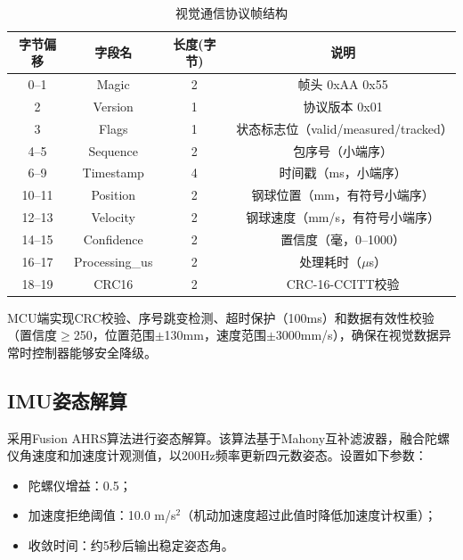 \documentclass[12pt,a4paper]{ctexart}
\begin{document}
\begin{table}[H]
    \centering
    \footnotesize
    \caption{视觉通信协议帧结构}
    \label{tab:vision_protocol}
    \begin{tabular}{|c|c|c|c|}
        \hline
        字节偏移 & 字段名 & 长度(字节) & 说明 \\
        \hline
        0--1 & Magic & 2 & 帧头 0xAA 0x55 \\
        \hline
        2 & Version & 1 & 协议版本 0x01 \\
        \hline
        3 & Flags & 1 & 状态标志位（valid/measured/tracked） \\
        \hline
        4--5 & Sequence & 2 & 包序号（小端序） \\
        \hline
        6--9 & Timestamp & 4 & 时间戳（ms，小端序） \\
        \hline
        10--11 & Position & 2 & 钢球位置（mm，有符号小端序） \\
        \hline
        12--13 & Velocity & 2 & 钢球速度（mm/s，有符号小端序） \\
        \hline
        14--15 & Confidence & 2 & 置信度（毫，0--1000） \\
        \hline
        16--17 & Processing\_us & 2 & 处理耗时（$\mu$s） \\
        \hline
        18--19 & CRC16 & 2 & CRC-16-CCITT校验 \\
        \hline
    \end{tabular}
\end{table}

MCU端实现CRC校验、序号跳变检测、超时保护（100ms）和数据有效性校验（置信度$\geq$250，位置范围$\pm$130mm，速度范围$\pm$3000mm/s），确保在视觉数据异常时控制器能够安全降级。

\subsection{\textbf{IMU姿态解算}}

采用Fusion AHRS算法进行姿态解算。该算法基于Mahony互补滤波器，融合陀螺仪角速度和加速度计观测值，以200Hz频率更新四元数姿态。设置如下参数：

\begin{itemize}
    \item 陀螺仪增益：0.5；
    \item 加速度拒绝阈值：10.0 m/s$^2$（机动加速度超过此值时降低加速度计权重）；
    \item 收敛时间：约5秒后输出稳定姿态角。
\end{itemize}
\end{document}
